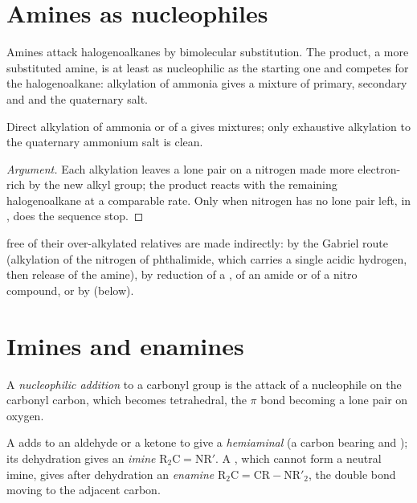 \section{Amines as nucleophiles}

Amines attack halogenoalkanes by bimolecular substitution. The product, a more substituted
amine, is at least as nucleophilic as the starting one and competes for the halogenoalkane:
alkylation of ammonia gives a mixture of primary, secondary and  and the
quaternary salt.

\begin{proposition}[Polyalkylation]\label{prop:b2:amines:polyalkylation}
Direct alkylation of ammonia or of a  gives mixtures; only exhaustive alkylation
to the quaternary ammonium salt is clean.
\end{proposition}

\begin{proof}[Argument]
Each alkylation leaves a lone pair on a nitrogen made more electron-rich by the new alkyl
group; the product reacts with the remaining halogenoalkane at a comparable rate. Only when
nitrogen has no lone pair left, in , does the sequence stop.
\end{proof}

 free of their over-alkylated relatives are made indirectly: by the Gabriel
route (alkylation of the nitrogen of phthalimide, which carries a single acidic hydrogen, then
release of the amine), by reduction of a , of an amide or of a nitro compound, or by
 (below).

\section{Imines and enamines}

\begin{definition}\label{def:b2:amines:nucleophilic-addition}
A \emph{nucleophilic addition} to a carbonyl group is the attack of
a nucleophile on the carbonyl carbon, which becomes tetrahedral, the  $\pi$ bond becoming
a lone pair on oxygen.
\end{definition}

\begin{definition}\label{def:b2:amines:imine}
A  adds to an aldehyde or a ketone to give a \emph{hemiaminal}
(a carbon bearing  and ); its dehydration gives an \emph{imine}
$\mathrm{R_2C{=}NR'}$. A , which cannot form a neutral imine, gives after dehydration an
\emph{enamine} $\mathrm{R_2C{=}CR{-}NR'_2}$, the double bond moving to the adjacent carbon.
\end{definition}

